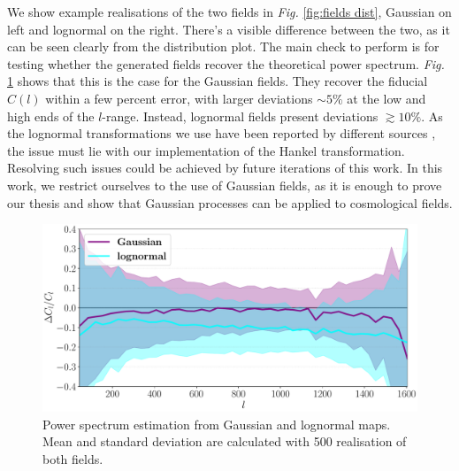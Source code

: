 We show example realisations of the two fields in \textit{Fig. }\ref{fig:fields dist}, Gaussian on left and lognormal on the right. There's a visible difference between the two, as it can be seen clearly from the distribution plot. The main check to perform is for testing whether the generated fields recover the theoretical power spectrum. \textit{Fig. }\ref{fig:check fields} shows that this is the case for the Gaussian fields. They recover the fiducial $C(l)$ within a few percent error, with larger deviations $\sim 5\%$ at the low and high ends of the $l$-range. Instead, lognormal fields present deviations $\gtrsim 10\%$. As the lognormal transformations we use have been reported by different sources \cite{fwdmodel}\cite{lognormal}, the issue must lie with our  implementation of the Hankel transformation. Resolving such issues could be achieved by future iterations of this work. In this work, we restrict ourselves to the use of Gaussian fields, as it is enough to prove our thesis and show that Gaussian processes can be applied to cosmological fields.
\begin{figure}[h]
    \centering
    \includegraphics[width=1\textwidth]{images/4_Gaussian_lognormal_check.pdf}
    \caption{\label{fig:check fields} Power spectrum estimation from  Gaussian and lognormal maps. Mean and standard deviation are calculated with 500 realisation of both fields.}
\end{figure}

